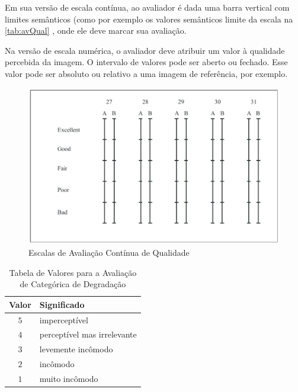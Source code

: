 \begin{description}
\begin{description}
				Em sua versão de escala contínua, ao avaliador é dada uma barra vertical com limites semânticos (como por exemplo os valores semânticos limite da escala na \autoref{tab:avQual} , onde ele deve marcar sua avaliação.

				Na versão de escala numérica, o avaliador deve atribuir um valor à qualidade percebida da imagem. O intervalo de valores pode ser aberto ou fechado. Esse valor pode ser absoluto ou relativo a uma imagem de referência, por exemplo.
		\end{description}
\end{description}


\begin{figure}[htb]
	\centering
	\begin{minipage}{.8\textwidth}
		\centering
		\caption{Escalas de Avaliação Contínua de Qualidade}\label{fig:contScale}
		\includegraphics[width=.8\textwidth]{../img/ContinuousQualityScale.pdf}
	\end{minipage}
\end{figure}

\begin{table}[htb]
	\footnotesize
	\caption[Avaliação de Degradação]{Tabela de Valores para a Avaliação de Categórica de Degradação}
	\label{tab:avDeg}
	\centering
 	\begin{tabular}{ c | l } %
		\textbf{Valor}	&	\textbf{Significado}		\\\hline %
		$5$		&	imperceptível			\\
		$4$		&	perceptível mas irrelevante	\\
		$3$		&	levemente incômodo		\\
		$2$		&	incômodo			\\
		$1$		&	muito incômodo			\\ \hline
	\end {tabular}
	\par
\end{table}

